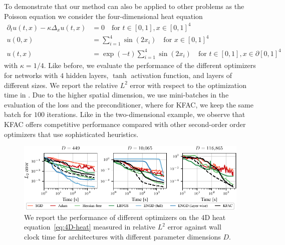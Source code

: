 To demonstrate that our method can also be applied to other problems as the Poisson equation we consider the four-dimensional heat equation
\begin{align}\label{eq:4D-heat}
     \partial_t u(t,x)-\kappa\Delta_x u(t,x) & = 0 \quad \text{for } t\in[0,1], x\in [0,1]^{4} \\
    u(0,x) & = \sum_{i=1}^{4} \sin(2 x_i) \quad \text{for }
     x\in [0,1]^{4}
     \\
     u(t,x) & = \exp(-t) \sum_{i=1}^{4} \sin(2 x_i) \quad \text{for } t\in[0,1], x\in\partial[0,1]^{4}
\end{align}
with $\kappa = 1/4$. Like before, we evaluate the performance of the different optimizers for networks with $4$ hidden layers, $\tanh$ activation function, and layers of different sizes.
We report the relative $L^2$ error with respect to the optimization time in .
Due to the higher spatial dimension, we use mini-batches in the evaluation of the loss and the preconditioner, where for KFAC, we keep the same batch for $100$ iterations. 
Like in the two-dimensional example, we observe that KFAC offers competitive performance compared with other second-order order optimizers that use sophisticated heuristics. 
\begin{figure}
    \centering
    \includegraphics{../kfac_pinns_exp/exp30_heat4d_groupplot/l2_error_over_time.pdf}
    \caption{We report the performance of different optimizers on the 4D heat equation~\eqref{eq:4D-heat} measured in relative $L^2$ error against wall clock time for architectures with different parameter dimensions $D$.}
    \label{fig:4D-heat}
\end{figure}


